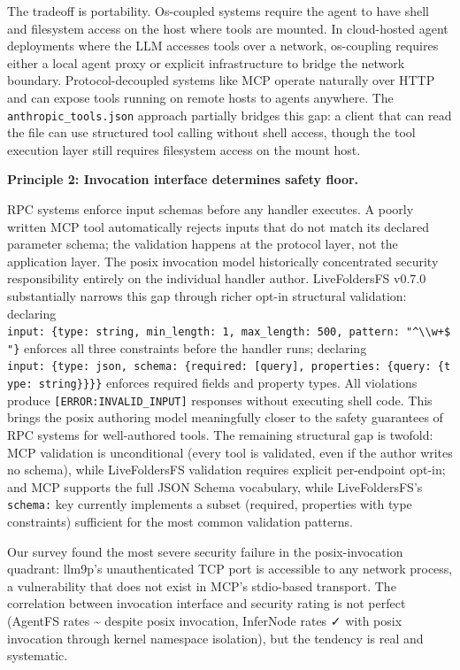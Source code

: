 \documentclass[
  11pt,
]{article}
\begin{document}
The tradeoff is portability. Os-coupled systems require the agent to
have shell and filesystem access on the host where tools are mounted. In
cloud-hosted agent deployments where the LLM accesses tools over a
network, os-coupling requires either a local agent proxy or explicit
infrastructure to bridge the network boundary. Protocol-decoupled
systems like MCP operate naturally over HTTP and can expose tools
running on remote hosts to agents anywhere. The
\texttt{anthropic\_tools.json} approach partially bridges this gap: a
client that can read the file can use structured tool calling without
shell access, though the tool execution layer still requires filesystem
access on the mount host.

\textbf{Principle 2: Invocation interface determines safety floor.}

RPC systems enforce input schemas before any handler executes. A poorly
written MCP tool automatically rejects inputs that do not match its
declared parameter schema; the validation happens at the protocol layer,
not the application layer. The posix invocation model historically
concentrated security responsibility entirely on the individual handler
author. LiveFoldersFS v0.7.0 substantially narrows this gap through
richer opt-in structural validation: declaring
\texttt{input:\ \{type:\ string,\ min\_length:\ 1,\ max\_length:\ 500,\ pattern:\ "\^{}\textbackslash{}\textbackslash{}w+\$"\}}
enforces all three constraints before the handler runs; declaring
\texttt{input:\ \{type:\ json,\ schema:\ \{required:\ {[}query{]},\ properties:\ \{query:\ \{type:\ string\}\}\}\}}
enforces required fields and property types. All violations produce
\texttt{{[}ERROR:INVALID\_INPUT{]}} responses without executing shell
code. This brings the posix authoring model meaningfully closer to the
safety guarantees of RPC systems for well-authored tools. The remaining
structural gap is twofold: MCP validation is unconditional (every tool
is validated, even if the author writes no schema), while LiveFoldersFS
validation requires explicit per-endpoint opt-in; and MCP supports the
full JSON Schema vocabulary, while LiveFoldersFS's \texttt{schema:} key
currently implements a subset (required, properties with type
constraints) sufficient for the most common validation patterns.

Our survey found the most severe security failure in the
posix-invocation quadrant: llm9p's unauthenticated TCP port is
accessible to any network process, a vulnerability that does not exist
in MCP's stdio-based transport. The correlation between invocation
interface and security rating is not perfect (AgentFS rates
\textasciitilde{} despite posix invocation, InferNode rates ✓ with posix
invocation through kernel namespace isolation), but the tendency is real
and systematic.
\end{document}
